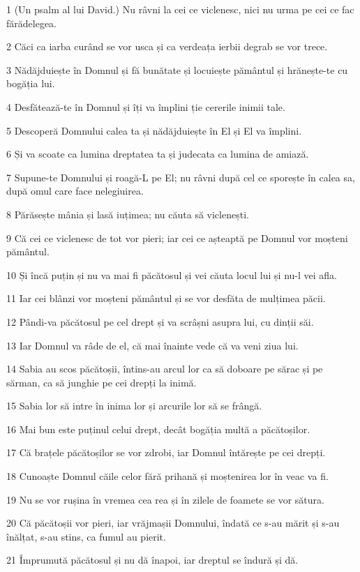 \par 1 (Un psalm al lui David.) Nu râvni la cei ce viclenesc, nici nu urma pe cei ce fac fărădelegea.
\par 2 Căci ca iarba curând se vor usca și ca verdeața ierbii degrab se vor trece.
\par 3 Nădăjduiește în Domnul și fă bunătate și locuiește pământul și hrănește-te cu bogăția lui.
\par 4 Desfătează-te în Domnul și îți va împlini ție cererile inimii tale.
\par 5 Descoperă Domnului calea ta și nădăjduiește în El și El va împlini.
\par 6 Și va scoate ca lumina dreptatea ta și judecata ca lumina de amiază.
\par 7 Supune-te Domnului și roagă-L pe El; nu râvni după cel ce sporește în calea sa, după omul care face nelegiuirea.
\par 8 Părăsește mânia și lasă iuțimea; nu căuta să viclenești.
\par 9 Că cei ce viclenesc de tot vor pieri; iar cei ce așteaptă pe Domnul vor moșteni pământul.
\par 10 Și încă puțin și nu va mai fi păcătosul și vei căuta locul lui și nu-l vei afla.
\par 11 Iar cei blânzi vor moșteni pământul și se vor desfăta de mulțimea păcii.
\par 12 Pândi-va păcătosul pe cel drept și va scrâșni asupra lui, cu dinții săi.
\par 13 Iar Domnul va râde de el, că mai înainte vede că va veni ziua lui.
\par 14 Sabia au scos păcătoșii, întins-au arcul lor ca să doboare pe sărac și pe sărman, ca să junghie pe cei drepți la inimă.
\par 15 Sabia lor să intre în inima lor și arcurile lor să se frângă.
\par 16 Mai bun este puținul celui drept, decât bogăția multă a păcătoșilor.
\par 17 Că brațele păcătoșilor se vor zdrobi, iar Domnul întărește pe cei drepți.
\par 18 Cunoaște Domnul căile celor fără prihană și moștenirea lor în veac va fi.
\par 19 Nu se vor rușina în vremea cea rea și în zilele de foamete se vor sătura.
\par 20 Că păcătoșii vor pieri, iar vrăjmașii Domnului, îndată ce s-au mărit și s-au înălțat, s-au stins, ca fumul au pierit.
\par 21 Împrumută păcătosul și nu dă înapoi, iar dreptul se îndură și dă.
